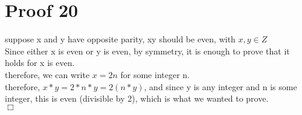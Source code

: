 \documentclass{article}
\begin{document}
\section{Proof 20}
suppose x and y have opposite parity, xy should be even, with $x,y \in Z$\\
Since either x is even or y is even, by symmetry, it is enough to prove that it holds for x is even.\\
therefore, we can write $x=2n$ for some integer n.\\
therefore, $x*y = 2*n*y = 2(n*y)$, and since y is any integer and n is some integer, this is even (divisible by 2), which is what we wanted to prove.\\
$\Box$

 
\end{document}

